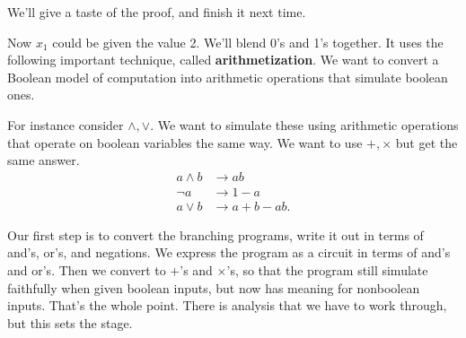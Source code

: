 We'll give a taste of the proof, and finish it next time. 

Now $x_1$ could be given the value 2. We'll blend 0's and 1's together. It uses the following important technique, called \textbf{arithmetization}. We want to convert a Boolean model of computation into arithmetic operations that simulate boolean ones. 

For instance consider $\wedge, \vee$. We want to simulate these using arithmetic operations that operate on boolean variables the same way. We want to use $+,\times$ but get the same answer.
\begin{align*}
a\wedge b &\to ab\\
\neg a&\to 1-a\\
a \vee b&\to  a+b-ab.
\end{align*}

Our first step is to convert the branching programs, write it out in terms of and's, or's, and negations. We express the program as a circuit in terms of and's and or's. Then we convert to $+$'s and $\times$'s, so that the program still simulate faithfully when given boolean inputs, but now has meaning for nonboolean inputs. That's the whole point. There is analysis that we have to work through, but this sets the stage.